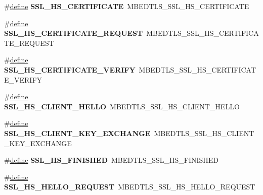 \begin{DoxyCompactItemize}
\item 
\mbox{\label{compat-1_83_8h_aaaaa25b3ce92c5da9f357928032c3614}} 
\#\hyperlink{structdefine}{define} {\bfseries S\+S\+L\+\_\+\+H\+S\+\_\+\+C\+E\+R\+T\+I\+F\+I\+C\+A\+TE}~M\+B\+E\+D\+T\+L\+S\+\_\+\+S\+S\+L\+\_\+\+H\+S\+\_\+\+C\+E\+R\+T\+I\+F\+I\+C\+A\+TE
\item 
\mbox{\label{compat-1_83_8h_a146ced9f8b0ae516cc78f1cec065b4a2}} 
\#\hyperlink{structdefine}{define} {\bfseries S\+S\+L\+\_\+\+H\+S\+\_\+\+C\+E\+R\+T\+I\+F\+I\+C\+A\+T\+E\+\_\+\+R\+E\+Q\+U\+E\+ST}~M\+B\+E\+D\+T\+L\+S\+\_\+\+S\+S\+L\+\_\+\+H\+S\+\_\+\+C\+E\+R\+T\+I\+F\+I\+C\+A\+T\+E\+\_\+\+R\+E\+Q\+U\+E\+ST
\item 
\mbox{\label{compat-1_83_8h_a373b6769a2f5555bc03d16f25fd43286}} 
\#\hyperlink{structdefine}{define} {\bfseries S\+S\+L\+\_\+\+H\+S\+\_\+\+C\+E\+R\+T\+I\+F\+I\+C\+A\+T\+E\+\_\+\+V\+E\+R\+I\+FY}~M\+B\+E\+D\+T\+L\+S\+\_\+\+S\+S\+L\+\_\+\+H\+S\+\_\+\+C\+E\+R\+T\+I\+F\+I\+C\+A\+T\+E\+\_\+\+V\+E\+R\+I\+FY
\item 
\mbox{\label{compat-1_83_8h_a565597ab4583db29a05d49c7fa0686a2}} 
\#\hyperlink{structdefine}{define} {\bfseries S\+S\+L\+\_\+\+H\+S\+\_\+\+C\+L\+I\+E\+N\+T\+\_\+\+H\+E\+L\+LO}~M\+B\+E\+D\+T\+L\+S\+\_\+\+S\+S\+L\+\_\+\+H\+S\+\_\+\+C\+L\+I\+E\+N\+T\+\_\+\+H\+E\+L\+LO
\item 
\mbox{\label{compat-1_83_8h_a3f20623ea264473b438e96339278c16b}} 
\#\hyperlink{structdefine}{define} {\bfseries S\+S\+L\+\_\+\+H\+S\+\_\+\+C\+L\+I\+E\+N\+T\+\_\+\+K\+E\+Y\+\_\+\+E\+X\+C\+H\+A\+N\+GE}~M\+B\+E\+D\+T\+L\+S\+\_\+\+S\+S\+L\+\_\+\+H\+S\+\_\+\+C\+L\+I\+E\+N\+T\+\_\+\+K\+E\+Y\+\_\+\+E\+X\+C\+H\+A\+N\+GE
\item 
\mbox{\label{compat-1_83_8h_a47bcc86840fcbc68b5a70bfca774258a}} 
\#\hyperlink{structdefine}{define} {\bfseries S\+S\+L\+\_\+\+H\+S\+\_\+\+F\+I\+N\+I\+S\+H\+ED}~M\+B\+E\+D\+T\+L\+S\+\_\+\+S\+S\+L\+\_\+\+H\+S\+\_\+\+F\+I\+N\+I\+S\+H\+ED
\item 
\mbox{\label{compat-1_83_8h_afda93251f735deb8569698986df4bb95}} 
\#\hyperlink{structdefine}{define} {\bfseries S\+S\+L\+\_\+\+H\+S\+\_\+\+H\+E\+L\+L\+O\+\_\+\+R\+E\+Q\+U\+E\+ST}~M\+B\+E\+D\+T\+L\+S\+\_\+\+S\+S\+L\+\_\+\+H\+S\+\_\+\+H\+E\+L\+L\+O\+\_\+\+R\+E\+Q\+U\+E\+ST

\end{DoxyCompactItemize}

